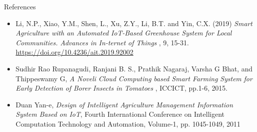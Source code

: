 \documentclass[presentation]{beamer}
\begin{document}
\begin{frame}[label={sec:org0908aa9}]{References}
\begin{itemize}
\item Li,  N.P.,  Xiao,  Y.M.,  Shen,  L.,  Xu,  Z.Y.,  Li,  B.T.  and  Yin,  C.X.
(2019) \emph{Smart   Agriculture   with   an   Automated  IoT-Based  Greenhouse
System  for  Local  Communities. Advances  in  In-ternet of Things} ,
9, 15-31. \url{https://doi.org/10.4236/ait.2019.92002}
\item Sudhir Rao Rupanagudi, Ranjani B. S., Prathik Nagaraj, Varsha G Bhat,
and Thippeswamy G, \emph{A Noveli Cloud Computing based Smart Farming System
for Early Detection of Borer Insects in Tomatoes} , ICCICT, pp.1-6, 2015.
\item Duan Yan-e, \emph{Design of Intelligent Agriculture Management Information
System Based on IoT}, Fourth International Conference on Intelligent
Computation Technology and Automation, Volume-1, pp. 1045-1049, 2011
\end{itemize}
\end{frame}
\end{document}
